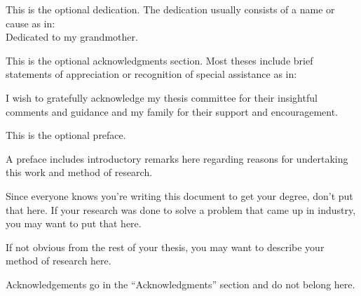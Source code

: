 %
%

%
%
%

\begin{dedication}
  This is the optional dedication.
  The dedication usually consists of a name or cause as in:\\
  Dedicated to my grandmother.
\end{dedication}

\begin{acknowledgments}
  This is the optional acknowledgments section.
  Most theses include brief statements of appreciation or recognition of special assistance as in:

  I wish to gratefully acknowledge my thesis committee for their insightful comments and guidance and my family for their support and encouragement.
\end{acknowledgments}

\begin{preface}
  This is the optional preface.

  A preface includes introductory remarks here regarding reasons for undertaking this work and method of research.

  Since everyone knows you're writing this document to get your degree, don't put that here.
  If your research was done to solve a problem that came up in industry, you may want to put that here.

  If not obvious from the rest of your thesis, you may want to describe your method of research here.

  Acknowledgements go in the ``Acknowledgments'' section and do not belong here.
\end{preface}

